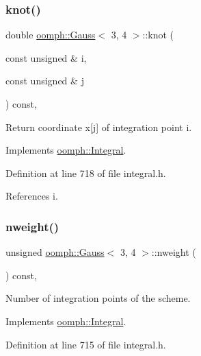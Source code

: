 \subsubsection{\texorpdfstring{knot()}{knot()}}
{\footnotesize\ttfamily double \hyperlink{classoomph_1_1Gauss}{oomph\+::\+Gauss}$<$ 3, 4 $>$\+::knot (\begin{DoxyParamCaption}\item[{const unsigned \&}]{i,  }\item[{const unsigned \&}]{j }\end{DoxyParamCaption}) const\hspace{0.3cm}{\ttfamily [inline]}, {\ttfamily [virtual]}}



Return coordinate x\mbox{[}j\mbox{]} of integration point i. 



Implements \hyperlink{classoomph_1_1Integral_a1a2122f99a87c18649bafdd9ed739758}{oomph\+::\+Integral}.



Definition at line 718 of file integral.\+h.



References i.

\mbox{\label{classoomph_1_1Gauss_3_013_00_014_01_4_a73941c3639b8601f7e4a7b1e007c3e71}} 
\subsubsection{\texorpdfstring{nweight()}{nweight()}}
{\footnotesize\ttfamily unsigned \hyperlink{classoomph_1_1Gauss}{oomph\+::\+Gauss}$<$ 3, 4 $>$\+::nweight (\begin{DoxyParamCaption}{ }\end{DoxyParamCaption}) const\hspace{0.3cm}{\ttfamily [inline]}, {\ttfamily [virtual]}}



Number of integration points of the scheme. 



Implements \hyperlink{classoomph_1_1Integral_a1a270de9d99a1fcf1d25a6c1017f65fa}{oomph\+::\+Integral}.



Definition at line 715 of file integral.\+h.

